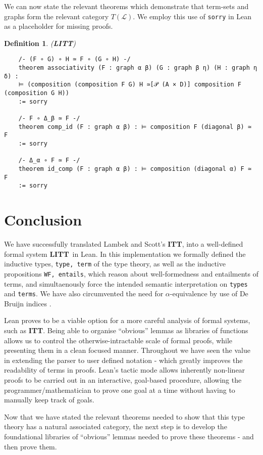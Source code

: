 \documentclass[12pt,leqno]{article}
\def\lc{\lstinline}
\newcommand{\ITT}{\textbf{ITT}}
\newcommand{\LITT}{\textbf{LITT}}
\theoremstyle{example}
\newtheorem{definition}[theorem]{Definition}
\numberwithin{equation}{section}
\begin{document}
We can now state the relevant theorems which demonstrate that term-sets and graphs form the relevant category $T(\mathcal{L})$. We employ this use of \lc{sorry} in Lean as a placeholder for missing proofs.

\begin{definition}(\textbf{LITT})
  \begin{lstlisting}
    /- (F ∘ G) ∘ H ≃ F ∘ (G ∘ H) -/
    theorem associativity (F : graph α β) (G : graph β η) (H : graph η δ) :
    ⊨ (composition (composition F G) H ≃[𝒫 (A × D)] composition F (composition G H)) 
    := sorry
    
    /- F ∘ Δ_β ≃ F -/
    theorem comp_id (F : graph α β) : ⊨ composition F (diagonal β) ≃ F
    := sorry
    
    /- Δ_α ∘ F ≃ F -/
    theorem id_comp (F : graph α β) : ⊨ composition (diagonal α) F ≃ F
    := sorry
  \end{lstlisting}
\end{definition}

\section{Conclusion}

We have successfully translated Lambek and Scott's \ITT \cite{lambek_scott}, into a well-defined formal system \LITT~in Lean. In this implementation we formally defined the inductive types, \lc{type, term} of the type theory, as well as the inductive propositions \lc{WF, entails}, which reason about well-formedness and entailments of terms, and simultaenously force the intended semantic interpretation on \lc{types} and \lc{terms}. We have also circumvented the need for $\alpha$-equivalence by use of De Bruijn indices \cite{pierce}.

Lean proves to be a viable option for a more careful analysis of formal systems, such as \ITT. Being able to organise ``obvious'' lemmas as libraries of functions allows us to control the otherwise-intractable scale of formal proofs, while presenting them in a clean focused manner. Throughout we have seen the value in extending the parser to user defined notation - which greatly improves the readability of terms in proofs. Lean's tactic mode allows inherently non-linear proofs to be carried out in an interactive, goal-based procedure, allowing the programmer/mathematician to prove one goal at a time without having to manually keep track of goals.

Now that we have stated the relevant theorems needed to show that this type theory has a natural associated category, the next step is to develop the foundational libraries of ``obvious'' lemmas needed to prove these theorems - and then prove them.
\end{document}
